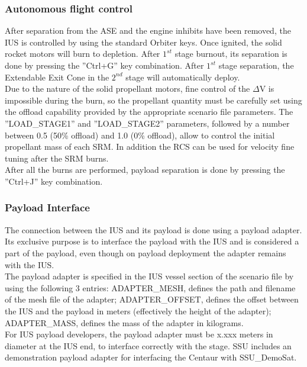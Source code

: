 \documentclass[Space_Shuttle_Ultra_Manual.tex]{subfiles}
\begin{document}
\begin{multicols*}{2}
\subsubsection{Autonomous flight control}
After separation from the ASE and the engine inhibits have been removed, the IUS is controlled by using the standard Orbiter keys. Once ignited, the solid rocket motors will burn to depletion. After $1^{st}$ stage burnout, its separation is done by pressing the ''Ctrl+G'' key combination. After $1^{st}$ stage separation, the Extendable Exit Cone in the $2^{nd}$ stage will automatically deploy.\\
Due to the nature of the solid propellant motors, fine control of the $\Delta$V is impossible during the burn, so the propellant quantity must be carefully set using the offload capability provided by the appropriate scenario file parameters. The ''LOAD\_STAGE1'' and ''LOAD\_STAGE2'' parameters, followed by a number between 0.5 (50\% offload) and 1.0 (0\% offload), allow to control the initial propellant mass of each SRM. In addition the RCS can be used for velocity fine tuning after the SRM burns.\\
After all the burns are performed, payload separation is done by pressing the ''Ctrl+J'' key combination.

\subsubsection{Payload Interface}
The connection between the IUS and its payload is done using a payload adapter. Its exclusive purpose is to interface the payload with the IUS and is considered a part of the payload, even though on payload deployment the adapter remains with the IUS.\\
The payload adapter is specified in the IUS vessel section of the scenario file by using the following 3 entries: ADAPTER\_MESH, defines the path and filename of the mesh file of the adapter; ADAPTER\_OFFSET, defines the offset between the IUS and the payload in meters (effectively the height of the adapter); ADAPTER\_MASS, defines the mass of the adapter in kilograms.\\
For IUS payload developers, the payload adapter must be x.xxx meters in diameter at the IUS end, to interface correctly with the stage. SSU includes an demonstration payload adapter for interfacing the Centaur with SSU\_DemoSat.

\end{multicols*}
\end{document}
